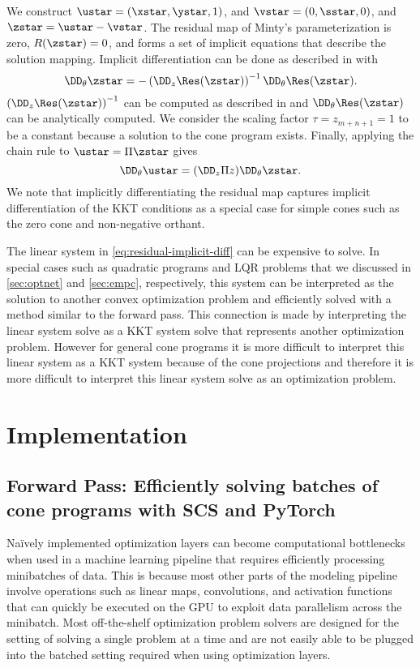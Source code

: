 We construct $\ustar=(\xstar, \ystar, 1)$,
and $\vstar=(0,\sstar, 0)$, and $\zstar=\ustar-\vstar$.
The residual map of Minty's parameterization is zero,
$R(\zstar)=0$, and forms a set of
implicit equations that describe the solution mapping.
Implicit differentiation can be done as described in
\citet{dontchev2009implicit} with
\begin{equation}
  \label{eq:residual-implicit-diff}
  \DD_\theta \zstar =
    -\left(\DD_z \Res(\zstar)\right)^{-1}
    \DD_\theta \Res(\zstar).
\end{equation}
$\left(\DD_z \Res(\zstar)\right)^{-1}$ can be computed
as described in \citep{busseti2018solution}
and $\DD_\theta \Res(\zstar)$ can be analytically computed.
We consider the scaling factor $\tau=z_{m+n+1}=1$ to be
a constant because a solution to the cone program exists.
Finally, applying the chain rule to $\ustar=\Pi \zstar$
gives
\begin{equation}
  \DD_\theta \ustar = (\DD_z \Pi z) \DD_\theta \zstar.
\end{equation}
We note that implicitly differentiating the residual
map captures implicit differentiation of the KKT conditions
as a special case for simple cones such as the zero cone
and non-negative orthant.

The linear system in \cref{eq:residual-implicit-diff}
can be expensive to solve.
In special cases such as quadratic programs and LQR problems
that we discussed in \cref{sec:optnet} and
\cref{sec:empc}, respectively, this system can be interpreted
as the solution to another convex optimization problem
and efficiently solved with a method similar to the
forward pass.
This connection is made by interpreting the linear system
solve as a KKT system solve that represents another
optimization problem.
However for general cone programs it is more difficult
to interpret this linear system as a KKT system
because of the cone projections and therefore it
is more difficult to interpret this linear system
solve as an optimization problem.

\section{Implementation}
\subsection{Forward Pass: Efficiently solving batches of
  cone programs with SCS and PyTorch}
\label{sec:cp:efficient}

Na\"ively implemented optimization layers can become
computational bottlenecks when used in a machine learning
pipeline that requires efficiently processing
minibatches of data.
This is because most other parts of the modeling pipeline
involve operations such as linear maps, convolutions,
and activation functions that can quickly be executed
on the GPU to exploit data parallelism across the minibatch.
Most off-the-shelf optimization problem solvers are designed for
the setting of solving a single problem at a time and are not easily
able to be plugged into the batched setting required
when using optimization layers.

